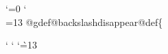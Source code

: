 {{%
%
\def\commondummiesnofonts{%
  \commondummyletter\!%
  \commondummyaccent\"%
  \commondummyaccent\'%
  \commondummyletter\*%
  \commondummyaccent\,%
  \commondummyletter\.%
  \commondummyletter\/%
  \commondummyletter\:%
  \commondummyaccent\=%
  \commondummyletter\?%
  \commondummyaccent\^%
  \commondummyaccent\`%
  \commondummyaccent\~%
  \commondummyword\u
  \commondummyword\v
  \commondummyword\H
  \commondummyword\dotaccent
  \commondummyword\ogonek
  \commondummyword\ringaccent
  \commondummyword\tieaccent
  \commondummyword\ubaraccent
  \commondummyword\udotaccent
  \commondummyword\dotless
  \commondummyword\b
  \commondummyword\i
  \commondummyword\r
  \commondummyword\sansserif
  \commondummyword\sc
  \commondummyword\slanted
  \commondummyword\t
  \commondummyword\abbr
  \commondummyword\acronym
  \commondummyword\anchor
  \commondummyword\cite
  \commondummyword\code
  \commondummyword\command
  \commondummyword\dfn
  \commondummyword\dmn
  \commondummyword\email
  \commondummyword\emph
  \commondummyword\env
  \commondummyword\file
  \commondummyword\image
  \commondummyword\indicateurl
  \commondummyword\inforef
  \commondummyword\kbd
  \commondummyword\key
  \commondummyword\math
  \commondummyword\option
  \commondummyword\pxref
  \commondummyword\ref
  \commondummyword\samp
  \commondummyword\strong
  \commondummyword\tie
  \commondummyword\U
  \commondummyword\uref
  \commondummyword\url
  \commondummyword\var
  \commondummyword\verb
  \commondummyword\w
  \commondummyword\xref
}

\let\indexlbrace\relax
\let\indexrbrace\relax
\let\indexatchar\relax
\let\indexbackslash\relax

{\catcode`\@=0
\catcode`\\=13
  @gdef@backslashdisappear{@def\{}}
}

{
\catcode`
\catcode`
\catcode`\`=13
  \gdef\indexnonalnumdisappear{%
    \expandafter\ifx\csname SETtxiindexlquoteignore\endcsname\relax\else
      \let`=\empty
    \fi
    \expandafter\ifx\csname SETtxiindexbackslashignore\endcsname\relax\else
      \backslashdisappear
    \fi
    \expandafter\ifx\csname SETtxiindexhyphenignore\endcsname\relax\else
      \def-{}%
    \fi
    \expandafter\ifx\csname SETtxiindexlessthanignore\endcsname\relax\else
      \def<{}%
    \fi
    \expandafter\ifx\csname SETtxiindexatsignignore\endcsname\relax\else
      \def\@{}%
    \fi
  }

}}

